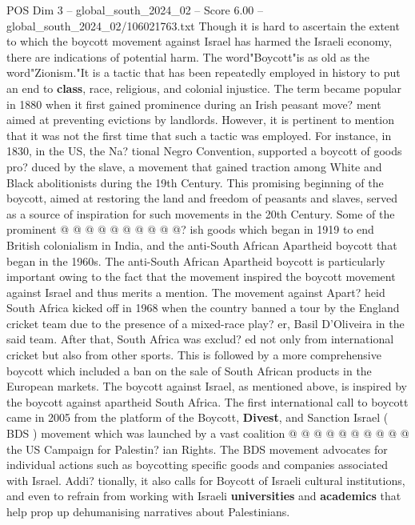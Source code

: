 \begin{textsample}{POS Dim 3 – global\_south\_2024\_02 – Score 6.00 – global\_south\_2024\_02/106021763.txt}  \label{ex:f3_pos_364}
Though it is hard to ascertain the extent to which the boycott movement against Israel has harmed the Israeli economy, there are indications of potential harm.
The word"Boycott"is as old as the word"Zionism."It is a tactic that has been repeatedly employed in history to put an end to \textbf{class}, race, religious, and colonial injustice.
The term became popular in 1880 when it first gained prominence during an Irish peasant move? ment aimed at preventing evictions by landlords.
However, it is pertinent to mention that it was not the first time that such a tactic was employed.
For instance, in 1830, in the US, the Na? tional Negro Convention, supported a boycott of goods pro? duced by the slave, a movement that gained traction among White and Black abolitionists during the 19th Century.
This promising beginning of the boycott, aimed at restoring the land and freedom of peasants and slaves, served as a source of inspiration for such movements in the 20th Century.
Some of the prominent @ @ @ @ @ @ @ @ @ @? ish goods which began in 1919 to end British colonialism in India, and the anti-South African Apartheid boycott that began in the 1960s.
The anti-South African Apartheid boycott is particularly important owing to the fact that the movement inspired the boycott movement against Israel and thus merits a mention.
The movement against Apart? heid South Africa kicked off in 1968 when the country banned a tour by the England cricket team due to the presence of a mixed-race play? er, Basil D'Oliveira in the said team.
After that, South Africa was exclud? ed not only from international cricket but also from other sports.
This is followed by a more comprehensive boycott which included a ban on the sale of South African products in the European markets.
The boycott against Israel, as mentioned above, is inspired by the boycott against apartheid South Africa.
The first international call to boycott came in 2005 from the platform of the Boycott, \textbf{Divest}, and Sanction Israel ( BDS ) movement which was launched by a vast coalition @ @ @ @ @ @ @ @ @ @ the US Campaign for Palestin? ian Rights.
The BDS movement advocates for individual actions such as boycotting specific goods and companies associated with Israel.
Addi? tionally, it also calls for Boycott of Israeli cultural institutions, and even to refrain from working with Israeli \textbf{universities} and \textbf{academics} that help prop up dehumanising narratives about Palestinians.

\end{textsample}
